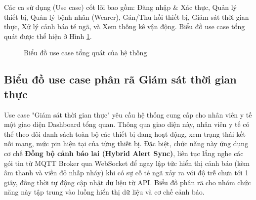 \documentclass[../DoAn.tex]{subfiles}
\begin{document}
Các ca sử dụng (Use case) cốt lõi bao gồm: Đăng nhập \& Xác thực, Quản lý thiết bị, Quản lý bệnh nhân (Wearer), Gán/Thu hồi thiết bị, Giám sát thời gian thực, Xử lý cảnh báo té ngã, và Xem thống kê vận động. Biểu đồ use case tổng quát được thể hiện ở Hình \ref{fig:use_case_tongquat}.

\begin{figure}[H]
    \centering
    \caption{Biểu đồ use case tổng quát của hệ thống}
    \label{fig:use_case_tongquat}
\end{figure}

\subsection{Biểu đồ use case phân rã Giám sát thời gian thực}
\label{subsection:2.2.2}
Use case "Giám sát thời gian thực" yêu cầu hệ thống cung cấp cho nhân viên y tế một giao diện Dashboard tổng quan. Thông qua giao diện này, nhân viên y tế có thể theo dõi danh sách toàn bộ các thiết bị đang hoạt động, xem trạng thái kết nối mạng, mức pin hiện tại của từng thiết bị. Đặc biệt, chức năng này ứng dụng cơ chế \textbf{Đồng bộ cảnh báo lai (Hybrid Alert Sync)}, liên tục lắng nghe các gói tin từ MQTT Broker qua WebSocket để ngay lập tức hiển thị cảnh báo (kèm âm thanh và viền đỏ nhấp nháy) khi có sự cố té ngã xảy ra với độ trễ chưa tới 1 giây, đồng thời tự động cập nhật dữ liệu từ API. Biểu đồ phân rã cho nhóm chức năng này tập trung vào luồng hiển thị dữ liệu và cơ chế cảnh báo.
\end{document}
